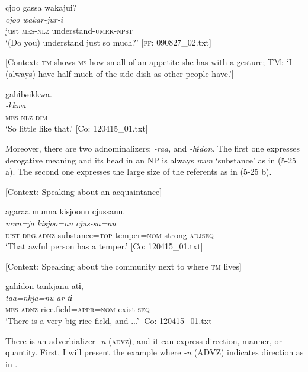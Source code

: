 \glll  cjoo  gassa  wakajui?\\
\textit{cjoo}  \textit{}  \textit{wakar-jur-i}\\
just  \textsc{mes}-\textsc{nlz}  understand-\textsc{umrk}-\textsc{npst}\\
\glt ‘(Do you) understand just so much?’ [\textsc{pf}: 090827\_02.txt]

 \ex \label{ex:5:24b} [Context: \textsc{tm} shows \textsc{ms} how small of an appetite she has with a gesture; TM: ‘I (always) have half much of the side dish as other people have.’]

\glll  gahɨbəikkwa.\\
\textit{-kkwa}\\
\textsc{mes}-\textsc{nlz}-\textsc{dim}\\
\glt ‘So little like that.’ [Co: 120415\_01.txt]
\z
\z

  Moreover, there are two adnominalizers: \textit{{}-raa}, and \textit{{}-hɨdon}. The first one expresses derogative meaning and its head in an NP is always \textit{mun} ‘substance’ as in (5-25 a). The second one expresses the large size of the referents as in (5-25 b).

\ea \label{ex:5:25}  \ea \label{ex:5:25a} [Context: Speaking about an acquaintance]

\glll  agaraa  munna  kisjoonu  cjussanu.\\
\textit{}  \textit{mun=ja}  \textit{kisjoo=nu}  \textit{cjus-sa=nu}\\
\textsc{dist}-\textsc{drg}.\textsc{adnz}  substance=\textsc{top}  temper=\textsc{nom}  strong-\textsc{adj}\textsc{seq}\\
\glt ‘That awful person has a temper.’ [Co: 120415\_01.txt]

 \ex \label{ex:5:b} [Context: Speaking about the community next to where \textsc{tm} lives]

\glll  gahɨdon  tankjanu  atɨ,\\
\textit{}  \textit{taa=nkja=nu}  \textit{ar-tɨ}\\
\textsc{mes}-\textsc{adnz}  rice.field=\textsc{appr}=\textsc{nom}  exist-\textsc{seq}\\
\glt ‘There is a very big rice field, and ...’ [Co: 120415\_01.txt]
\z
\z

  There is an adverbializer \textit{-n} (\textsc{advz}), and it can express direction, manner, or quantity. First, I will present the example where \textit{{}-n} (ADVZ) indicates direction as in .

